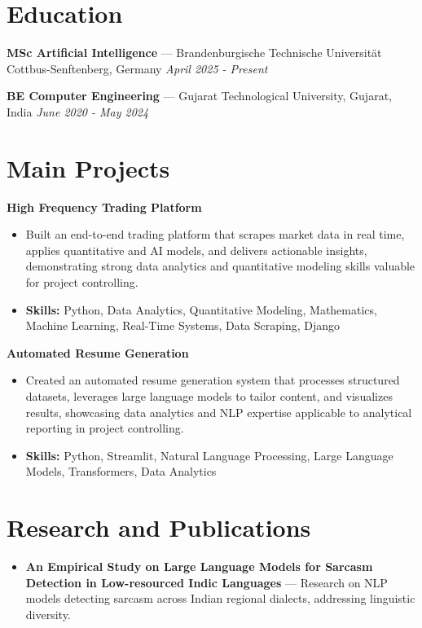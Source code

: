 \documentclass[a4paper,10pt]{article}
\begin{document}
\section*{Education}
\textbf{MSc Artificial Intelligence} — Brandenburgische Technische Universität Cottbus-Senftenberg, Germany \hfill \textit{April 2025 - Present}\par
\vspace{1.5pt}
\textbf{BE Computer Engineering} — Gujarat Technological University, Gujarat, India \hfill \textit{June 2020 - May 2024}\par

\section*{Main Projects}
\textbf{High Frequency Trading Platform}\par
\vspace{1pt}
\begin{itemize}
  \item Built an end-to-end trading platform that scrapes market data in real time, applies quantitative and AI models, and delivers actionable insights, demonstrating strong data analytics and quantitative modeling skills valuable for project controlling.
  \item \textbf{Skills:} Python, Data Analytics, Quantitative Modeling, Mathematics, Machine Learning, Real-Time Systems, Data Scraping, Django
\end{itemize}
\vspace{3pt}
\textbf{Automated Resume Generation}\par
\vspace{1pt}
\begin{itemize}
  \item Created an automated resume generation system that processes structured datasets, leverages large language models to tailor content, and visualizes results, showcasing data analytics and NLP expertise applicable to analytical reporting in project controlling.
  \item \textbf{Skills:} Python, Streamlit, Natural Language Processing, Large Language Models, Transformers, Data Analytics
\end{itemize}

\section*{Research and Publications}
\begin{itemize}
\item \textbf{An Empirical Study on Large Language Models for Sarcasm Detection in Low-resourced Indic Languages} — Research on NLP models detecting sarcasm across Indian regional dialects, addressing linguistic diversity.
\end{itemize}
\end{document}
